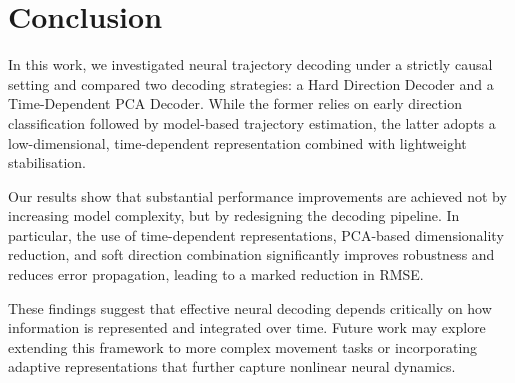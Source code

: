 \section{Conclusion}

In this work, we investigated neural trajectory decoding under a strictly causal setting and compared two decoding strategies: a Hard Direction Decoder and a Time-Dependent PCA Decoder. While the former relies on early direction classification followed by model-based trajectory estimation, the latter adopts a low-dimensional, time-dependent representation combined with lightweight stabilisation.

Our results show that substantial performance improvements are achieved not by increasing model complexity, but by redesigning the decoding pipeline. In particular, the use of time-dependent representations, PCA-based dimensionality reduction, and soft direction combination significantly improves robustness and reduces error propagation, leading to a marked reduction in RMSE.

These findings suggest that effective neural decoding depends critically on how information is represented and integrated over time. Future work may explore extending this framework to more complex movement tasks or incorporating adaptive representations that further capture nonlinear neural dynamics.